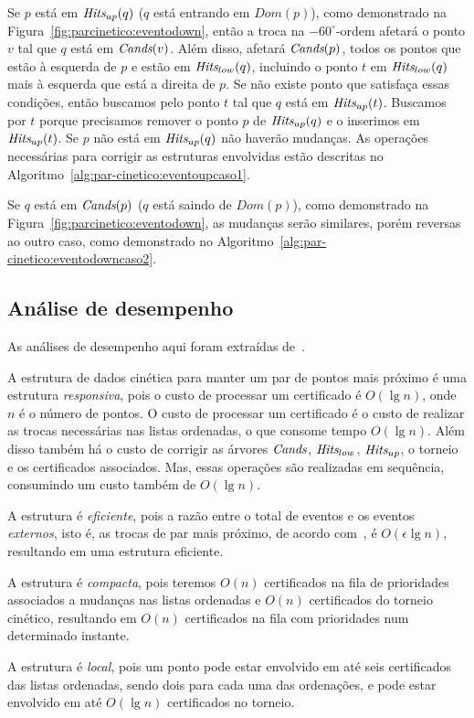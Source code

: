 Se $p$ está em $\textit{Hits}_{up}(q)$ ($q$ está entrando em $Dom(p)$), como demonstrado na
Figura~\ref{fig:parcinetico:eventodown}, então a troca na $-60^\circ$-ordem afetará o ponto $v$ tal
que $q$ está em $\textit{Cands}(v)$.
Além disso, afetará $\textit{Cands}(p)$, todos os pontos que estão à esquerda de $p$ e estão em
$\textit{Hits}_{low}(q)$, incluindo o ponto $t$ em $\textit{Hits}_{low}(q)$ mais à esquerda que está a
direita de $p$.
Se não existe ponto que satisfaça essas condições, então buscamos pelo ponto $t$ tal que $q$ está
em $\textit{Hits}_{up}(t)$.
Buscamos por $t$ porque precisamos remover o ponto $p$ de $\textit{Hits}_{up}(q)$ e o inserimos em
$\textit{Hits}_{up}(t)$.
Se $p$ não está em $\textit{Hits}_{up}(q)$ não haverão mudanças.
As operações necessárias para corrigir as estruturas envolvidas estão descritas no
Algoritmo~\ref{alg:par-cinetico:eventoupcaso1}.



Se $q$ está em $\textit{Cands}(p)$ ($q$ está saindo de $Dom(p)$), como demonstrado na
Figura~\ref{fig:parcinetico:eventodown}, as mudanças serão similares, porém reversas ao outro
caso, como demonstrado no Algoritmo~\ref{alg:par-cinetico:eventodowncaso2}.



\FloatBarrier

\subsection{Análise de desempenho}\label{subsec:par:analise-de-desempenho}

As análises de desempenho aqui foram extraídas de~\cite{eduardo}.

A estrutura de dados cinética para manter um par de pontos mais próximo é uma estrutura
\textit{responsiva}, pois o custo de processar um certificado é $O(\lg{n})$, onde $n$ é o número
de pontos.
O custo de processar um certificado é o custo de realizar as trocas necessárias nas listas
ordenadas, o que consome tempo $O(\lg{n})$.
Além disso também há o custo de corrigir as árvores $\textit{Cands}$, $\textit{Hits}_{low}$, $\textit{Hits}_{up}$, o
torneio e os certificados associados.
Mas, essas operações são realizadas em sequência, consumindo um custo também de $O(\lg{n})$.

A estrutura é \textit{eficiente}, pois a razão entre o total de eventos e os eventos
\textit{externos}, isto é, as trocas de par mais próximo, de acordo com~\cite{eduardo}, é
$O(\epsilon \lg{n})$, resultando em uma estrutura eficiente.

A estrutura é \textit{compacta}, pois teremos $O(n)$ certificados na fila de prioridades
associados a mudanças nas listas ordenadas e $O(n)$ certificados do torneio cinético, resultando
em $O(n)$ certificados na fila com prioridades num determinado instante.

A estrutura é \textit{local}, pois um ponto pode estar envolvido em até seis certificados das
listas ordenadas, sendo dois para cada uma das ordenações, e pode estar envolvido em até
$O(\lg{n})$ certificados no torneio.
